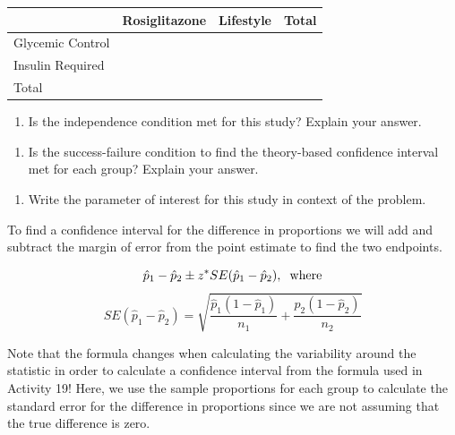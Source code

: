 \documentclass[
]{report}
\providecommand{\tightlist}{%
  \setlength{\itemsep}{0pt}\setlength{\parskip}{0pt}}
\begin{document}
\begin{longtable}[]{@{}llll@{}}
\toprule
& Rosiglitazone & Lifestyle & Total \\
\midrule
\endhead
Glycemic Control & & & \\
Insulin Required & & & \\
Total & & & \\
\bottomrule
\end{longtable}

\begin{enumerate}
\def\labelenumi{\arabic{enumi}.}
\setcounter{enumi}{2}
\tightlist
\item
  Is the independence condition met for this study? Explain your answer.
\end{enumerate}

\vspace{0.8in}

\begin{enumerate}
\def\labelenumi{\arabic{enumi}.}
\setcounter{enumi}{3}
\tightlist
\item
  Is the success-failure condition to find the theory-based confidence interval met for each group? Explain your answer.
\end{enumerate}

\vspace{1in}

\begin{enumerate}
\def\labelenumi{\arabic{enumi}.}
\setcounter{enumi}{4}
\tightlist
\item
  Write the parameter of interest for this study in context of the problem.
\end{enumerate}

\vspace{0.8in}

To find a confidence interval for the difference in proportions we will add and subtract the margin of error from the point estimate to find the two endpoints.

\[\hat{p}_1-\hat{p}_2\pm z^*SE(\hat{p}_1-\hat{p}_2), \hspace{.2cm} \text{where}\]
\[SE(\hat{p}_1-\hat{p}_2) = \sqrt{\frac{\hat{p}_1 (1-\hat{p}_1)}{n_1}+\frac{\hat{p}_2 (1-\hat{p}_2)}{n_2}}\]

Note that the formula changes when calculating the variability around the statistic in order to calculate a confidence interval from the formula used in Activity 19! Here, we use the sample proportions for each group to calculate the standard error for the difference in proportions since we are not assuming that the true difference is zero.
\end{document}
